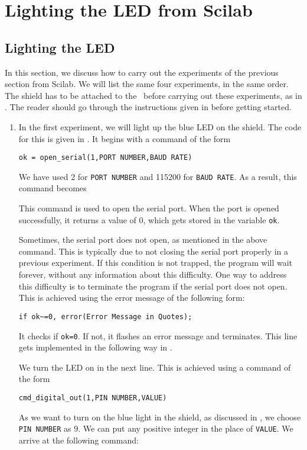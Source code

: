 \section{Lighting the LED from Scilab}
\subsection{Lighting the LED}
\label{sec:light-sci}
In this section, we discuss how to carry out the experiments of the
previous section from Scilab.  We will list the same four experiments,
in the same order.  The shield has to be attached to the \arduino\
before carrying out these experiments, as in .
The reader should go through the instructions given in
 before getting started.
\begin{enumerate}
\item In the first experiment, we will light up the blue LED on the
  shield.  The code for this is given in \sciref{sci:led-blue}.  It
  begins with a command of the form
  \begin{lstlisting}[style=nonumbers]
     ok = open_serial(1,PORT NUMBER,BAUD RATE)
  \end{lstlisting}
  We have used 2 for {\tt PORT NUMBER} and 115200 for {\tt BAUD RATE}.
  As a result, this command becomes
  
  This command is used to open the serial port.  When the port is
  opened successfully, it returns a value of 0, which gets stored in
  the variable {\tt ok}.

  Sometimes, the serial port does not open, as mentioned in the above
  command.  This is typically due to not closing the serial port
  properly in a previous experiment.  If this condition is not
  trapped, the program will wait forever, without any information
  about this difficulty.  One way to address this difficulty is to
  terminate the program if the serial port does not open.  This is
  achieved using the error message of the following form:
  \begin{lstlisting}[style=nonumbers]
     if ok~=0, error(Error Message in Quotes);
  \end{lstlisting}
  It checks if {\tt ok=0}.  If not, it flashes an error message and
  terminates.  This line gets implemented in the following way in
  \sciref{sci:led-blue}.  
  

  We turn the LED on in the next line.  This is achieved using a
  command of the form
  \begin{lstlisting}[style=nonumbers]
    cmd_digital_out(1,PIN NUMBER,VALUE)
  \end{lstlisting}
  As we want to turn on the blue light in the shield, as discussed in
  \secref{sec:light-ard}, we choose {\tt PIN NUMBER} as 9.  We can put
  any positive integer in the place of {\tt VALUE}.  We arrive at the
  following command:
  


\end{enumerate}
